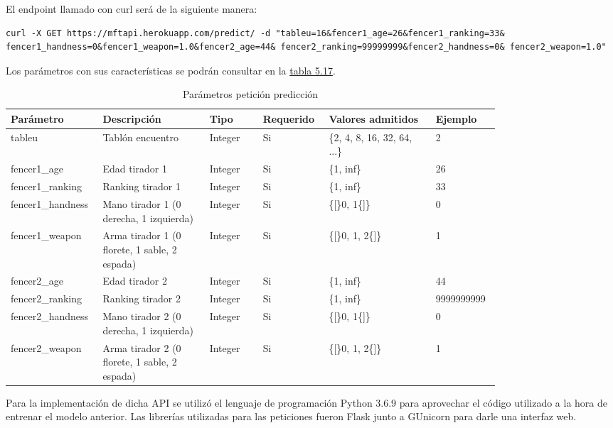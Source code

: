 El endpoint llamado con curl será de la siguiente manera:

\begin{lstlisting}
curl -X GET https://mftapi.herokuapp.com/predict/ -d "tableu=16&fencer1_age=26&fencer1_ranking=33& fencer1_handness=0&fencer1_weapon=1.0&fencer2_age=44& fencer2_ranking=99999999&fencer2_handness=0& fencer2_weapon=1.0"
\end{lstlisting}

Los parámetros con sus características se podrán consultar en la \hyperref[tab:Parmetros peticion prediccion]{tabla 5.17}.


\begin{longtable}{p{0.1\linewidth} | p{0.2\linewidth} p{0.1\linewidth} p{0.1\linewidth} p{0.2\linewidth} p{0.1\linewidth}}
	\caption{Parámetros petición predicción}
	\label{tab:Parmetros peticion prediccion}

  \endfirsthead
  \endhead

  Parámetro & Descripción & Tipo & Requerido & Valores admitidos & Ejemplo \\ \hline
  tableu & Tablón encuentro & Integer & Si & \{2, 4, 8, 16, 32, 64, ...\} & 2 \\ \hline
  fencer1\_age & Edad tirador 1 & Integer & Si & \{1, inf\} & 26 \\
  fencer1\_ranking & Ranking tirador 1 & Integer & Si & \{1, inf\} & 33 \\
  fencer1\_handness & Mano tirador 1 (0 derecha, 1 izquierda) & Integer & Si & \{{[}\}0, 1\{{]}\} & 0 \\
  fencer1\_weapon & Arma tirador 1 (0 florete, 1 sable, 2 espada) & Integer & Si & \{{[}\}0, 1, 2\{{]}\} & 1 \\ \hline
  fencer2\_age & Edad tirador 2 & Integer & Si & \{1, inf\} & 44 \\
  fencer2\_ranking & Ranking tirador 2 & Integer & Si & \{1, inf\} & 9999999999 \\
  fencer2\_handness & Mano tirador 2 (0 derecha, 1 izquierda) & Integer & Si & \{{[}\}0, 1\{{]}\} & 0 \\
  fencer2\_weapon & Arma tirador 2 (0 florete, 1 sable, 2 espada) & Integer & Si & \{{[}\}0, 1, 2\{{]}\} & 1
\end{longtable}

Para la implementación de dicha API se utilizó el lenguaje de programación Python 3.6.9 para
aprovechar el código utilizado a la hora de entrenar el modelo anterior. Las librerías
utilizadas para las peticiones fueron Flask junto a GUnicorn para darle una interfaz web.


